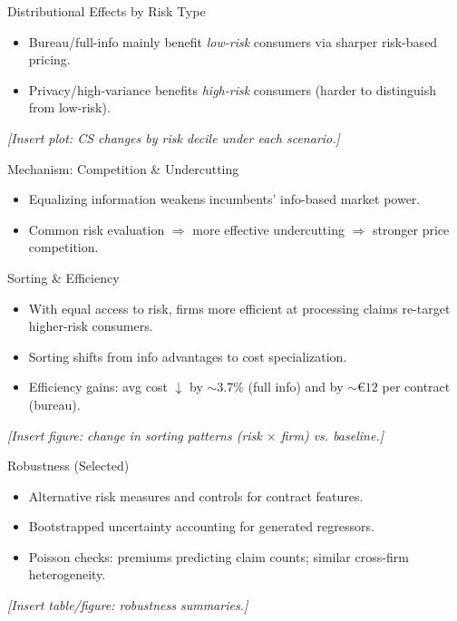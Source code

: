 \documentclass[11pt]{beamer}
\begin{document}
\begin{frame}{Distributional Effects by Risk Type}
\justifying
\begin{itemize}
  \item Bureau/full-info mainly benefit \emph{low-risk} consumers via sharper risk-based pricing.
  \item Privacy/high-variance benefits \emph{high-risk} consumers (harder to distinguish from low-risk).
\end{itemize}
\vspace{0.75em}
\begin{center}
\textit{[Insert plot: CS changes by risk decile under each scenario.]}
\end{center}
\end{frame}

\begin{frame}{Mechanism: Competition \& Undercutting}
\justifying
\begin{itemize}
  \item Equalizing information weakens incumbents’ info-based market power.
  \item Common risk evaluation $\Rightarrow$ more effective undercutting $\Rightarrow$ stronger price competition.
\end{itemize}
\end{frame}

\begin{frame}{Sorting \& Efficiency}
\justifying
\begin{itemize}
  \item With equal access to risk, firms more efficient at processing claims re-target higher-risk consumers.
  \item Sorting shifts from info advantages to cost specialization.
  \item Efficiency gains: avg cost $\downarrow$ by $\sim$3.7\% (full info) and by $\sim€12$ per contract (bureau).
\end{itemize}
\vspace{0.75em}
\begin{center}
\textit{[Insert figure: change in sorting patterns (risk $\times$ firm) vs. baseline.]}
\end{center}
\end{frame}

\begin{frame}{Robustness (Selected)}
\justifying
\begin{itemize}
  \item Alternative risk measures and controls for contract features.
  \item Bootstrapped uncertainty accounting for generated regressors.
  \item Poisson checks: premiums predicting claim counts; similar cross-firm heterogeneity.
\end{itemize}
\vspace{0.75em}
\begin{center}
\textit{[Insert table/figure: robustness summaries.]}
\end{center}
\end{frame}
\end{document}
